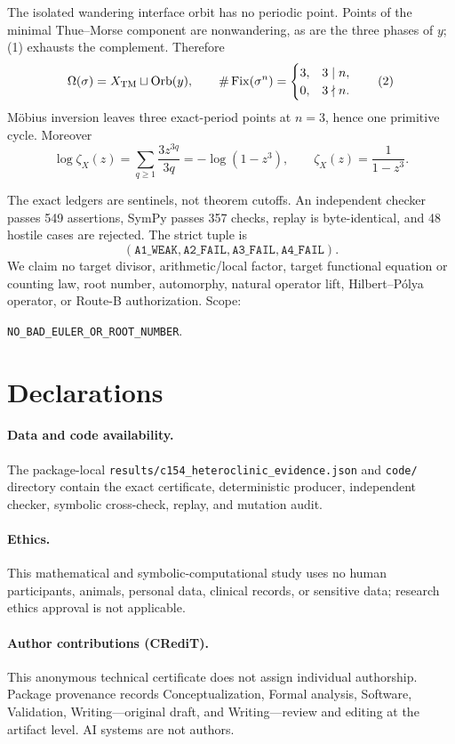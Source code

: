 \documentclass[10pt]{article}
\begin{document}
The isolated wandering interface orbit has no periodic point.  Points of the
minimal Thue--Morse component are nonwandering, as are the three phases of
$y$; (1) exhausts the complement.  Therefore
\[
\Omega(\sigma)=X_{\rm TM}\sqcup\operatorname{Orb}(y),\qquad
\#\operatorname{Fix}(\sigma^n)=
\begin{cases}3,&3\mid n,\\0,&3\nmid n.
\end{cases}\tag{2}
\]
M\"obius inversion leaves three exact-period points at $n=3$, hence one
primitive cycle.  Moreover
\[
\log\zeta_X(z)=\sum_{q\geq1}\frac{3z^{3q}}{3q}
=-\log(1-z^3),\qquad \zeta_X(z)=\frac1{1-z^3}.\tag{3}
\]

The exact ledgers are sentinels, not theorem cutoffs.  An independent checker
passes 549 assertions, SymPy passes 357 checks, replay is byte-identical, and
48 hostile cases are rejected.  The strict tuple is
\[
(\texttt{A1\_WEAK},\texttt{A2\_FAIL},\texttt{A3\_FAIL},
\texttt{A4\_FAIL}).
\]
We claim no target divisor, arithmetic/local factor,
target functional equation or counting law, root number, automorphy, natural
operator lift, Hilbert--P\'olya operator, or Route-B authorization.  Scope:
\begin{center}
\texttt{NO\_BAD\_EULER\_OR\_ROOT\_NUMBER}.
\end{center}

\section*{Declarations}
\paragraph{Data and code availability.}
The package-local \texttt{results/c154\_heteroclinic\_evidence.json} and
\texttt{code/} directory contain the exact certificate, deterministic
producer, independent checker, symbolic cross-check, replay, and mutation
audit.
\paragraph{Ethics.}
This mathematical and symbolic-computational study uses no human
participants, animals, personal data, clinical records, or sensitive data;
research ethics approval is not applicable.
\paragraph{Author contributions (CRediT).}
This anonymous technical certificate does not assign individual authorship.
Package provenance records Conceptualization, Formal analysis, Software,
Validation, Writing---original draft, and Writing---review and editing at the
artifact level.  AI systems are not authors.
\end{document}
